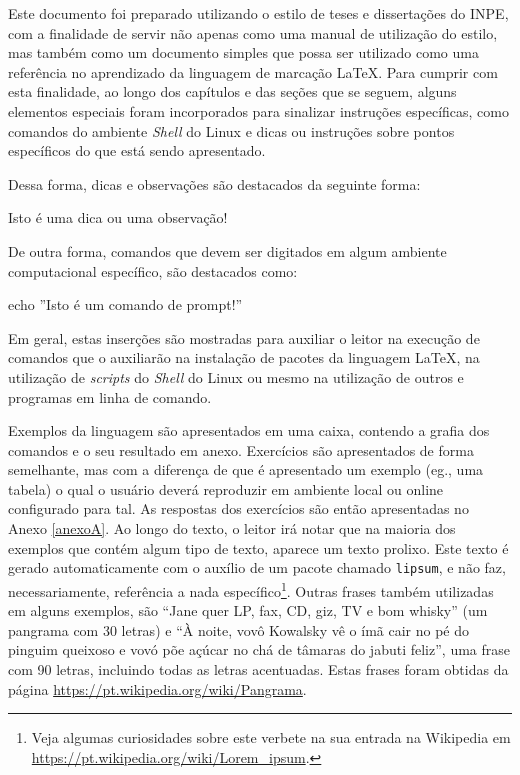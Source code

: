 Este documento foi preparado utilizando o estilo de teses e dissertações do INPE, com a finalidade de servir não apenas como uma manual de utilização do estilo, mas também como um documento simples que possa ser utilizado como uma referência no aprendizado da linguagem de marcação \LaTeX{}. Para cumprir com esta finalidade, ao longo dos capítulos e das seções que se seguem, alguns elementos especiais foram incorporados para sinalizar instruções específicas, como comandos do ambiente \textit{Shell} do Linux e dicas ou instruções sobre pontos específicos do que está sendo apresentado. 

Dessa forma, dicas e observações são destacados da seguinte forma:

\begin{marker}
Isto é uma dica ou uma observação!
\end{marker}

De outra forma, comandos que devem ser digitados em algum ambiente computacional específico, são destacados como:

\begin{meucomando}
echo ''Isto é um comando de prompt!''
\end{meucomando}

Em geral, estas inserções são mostradas para auxiliar o leitor na execução de comandos que o auxiliarão na instalação de pacotes da linguagem \LaTeX{}, na utilização de \textit{scripts} do \textit{Shell} do Linux ou mesmo na utilização de outros e programas em linha de comando.

Exemplos da linguagem são apresentados em uma caixa, contendo a grafia dos comandos e o seu resultado em anexo. Exercícios são apresentados de forma semelhante, mas com a diferença de que é apresentado um exemplo (eg., uma tabela) o qual o usuário deverá reproduzir em ambiente local ou online configurado para tal. As respostas dos exercícios são então apresentadas no Anexo \ref{anexoA}. Ao longo do texto, o leitor irá notar que na maioria dos exemplos que contém algum tipo de texto, aparece um texto prolixo. Este texto é gerado automaticamente com o auxílio de um pacote chamado {\tt lipsum}, e não faz, necessariamente, referência a nada específico\footnote{Veja algumas curiosidades sobre este verbete na sua entrada na Wikipedia em \url{https://pt.wikipedia.org/wiki/Lorem_ipsum}.}. Outras frases também utilizadas em alguns exemplos, são ``Jane quer LP, fax, CD, giz, TV e bom whisky'' (um pangrama com 30 letras) e ``À noite, vovô Kowalsky vê o ímã cair no pé do pinguim queixoso e vovó põe açúcar no chá de tâmaras do jabuti feliz'', uma frase com 90 letras, incluindo todas as letras acentuadas. Estas frases foram obtidas da página \url{https://pt.wikipedia.org/wiki/Pangrama}.

